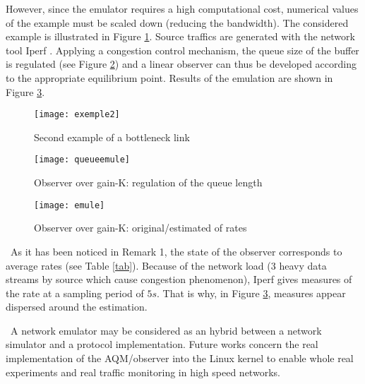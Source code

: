 \documentclass[a4paper, 10pt, onecolumn]{article}
\begin{document}
However, since the emulator requires a high computational cost, numerical values of the example must be scaled down (reducing the bandwidth). The considered example is illustrated in Figure \ref{exemple2}. Source traffics are generated with the network tool Iperf \cite{iperf}. Applying a congestion control mechanism, the queue size of the buffer is regulated (see Figure \ref{queueemule}) and a linear observer can thus be developed according to the appropriate equilibrium point. Results of the emulation are shown in Figure \ref{emule}.
\begin{figure}
       \centerline{\texttt{[image: exemple2]}}
\vspace*{-1.5cm}
       \caption{Second example of a bottleneck link}
       \label{exemple2}
\end{figure}

\begin{figure}
       \centerline{\texttt{[image: queueemule]}}
       \caption{Observer over gain-K: regulation of the queue length}
       \label{queueemule}
\end{figure}

\begin{figure}
       \centerline{\texttt{[image: emule]}}
\vspace*{-2cm}
       \caption{Observer over gain-K: original/estimated of rates}
       \label{emule}
\end{figure}

~\indent As it has been noticed in Remark 1, the state of the observer corresponds to average rates (see Table \ref{tab}). Because of the network load (3 heavy data streams by source which cause congestion phenomenon), Iperf gives measures of the rate at a sampling period of $5s$. That is why, in Figure \ref{emule}, measures appear dispersed around the estimation.

~\indent A network emulator may be considered as an hybrid between a network simulator and a protocol implementation. Future works concern the real implementation of the AQM/observer into the Linux kernel to enable whole real experiments and real traffic monitoring in high speed networks.\\
\end{document}

